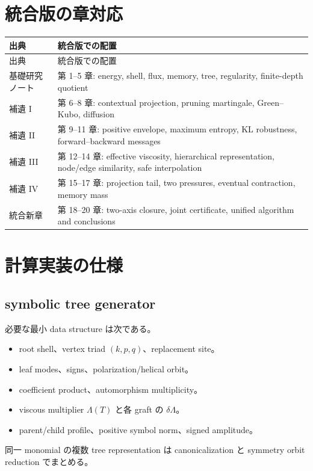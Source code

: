 \documentclass[11pt,a4paper,openany]{book}
\numberwithin{equation}{chapter}
\begin{document}
\chapter{統合版の章対応}
\begin{longtable}{p{}p{}}
\toprule
出典 & 統合版での配置 \\
\midrule
\endfirsthead
\toprule
出典 & 統合版での配置 \\
\midrule
\endhead
基礎研究ノート & 第 1--5 章: energy, shell, flux, memory, tree, regularity, finite-depth quotient \\
補遺 I & 第 6--8 章: contextual projection, pruning martingale, Green--Kubo, diffusion \\
補遺 II & 第 9--11 章: positive envelope, maximum entropy, KL robustness, forward--backward messages \\
補遺 III & 第 12--14 章: effective viscosity, hierarchical representation, node/edge similarity, safe interpolation \\
補遺 IV & 第 15--17 章: projection tail, two pressures, eventual contraction, memory mass \\
統合新章 & 第 18--20 章: two-axis closure, joint certificate, unified algorithm and conclusions \\
\bottomrule
\end{longtable}

\chapter{計算実装の仕様}
\section{symbolic tree generator}
必要な最小 data structure は次である。
\begin{itemize}
\item root shell、vertex triad $(k,p,q)$、replacement site。
\item leaf modes、signs、polarization/helical orbit。
\item coefficient product、automorphism multiplicity。
\item viscous multiplier $\Lambda(T)$ と各 graft の $\delta\Lambda$。
\item parent/child profile、positive symbol norm、signed amplitude。
\end{itemize}
同一 monomial の複数 tree representation は canonicalization と symmetry orbit reduction でまとめる。
\end{document}
